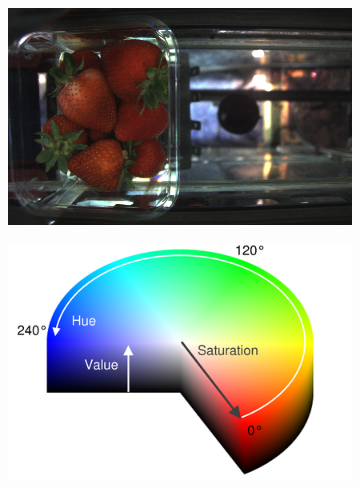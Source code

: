 \documentclass[fleqn,twoside]{article}
\begin{document}
\begin{figure}[ht]
	\centering
	\begin{subfigure}{.4\textwidth}
		\centering
		\includegraphics[width=.9\linewidth]{bg_example.png}
		\caption{}
		\label{fig:bg_example}
	\end{subfigure}%
	\begin{subfigure}{.4\textwidth}
		\centering
		\includegraphics[width=.9\linewidth]{hue_sat.png}
		\caption{}
		\label{fig:hue_sat}
	\end{subfigure}%


\end{figure}
\end{document}
